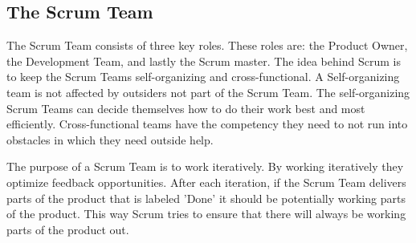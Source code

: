 \subsection{The Scrum Team}


The Scrum Team consists of three key roles. These roles are: the Product Owner, the 
Development Team, and lastly the Scrum master\cite{scrumguide11}. The idea behind Scrum is 
to keep the Scrum Teams self-organizing and cross-functional. A Self-organizing team is not 
affected by outsiders not part of the Scrum Team\cite{scrumguide11}. The self-organizing 
Scrum Teams can decide themselves how to do their work best and most 
efficiently\cite{scrumguide11}. Cross-functional teams have the competency they need to not 
run into obstacles in which they need outside help\cite{scrumguide11}.


The purpose of a Scrum Team is to work iteratively\cite{scrumguide11}. By working
iteratively they optimize feedback opportunities\cite{scrumguide11}. After each iteration,
if the Scrum Team delivers parts of the product that is labeled 'Done' it should be
potentially working parts of the product\cite{scrumguide11}. This way Scrum tries to ensure
that there will always be working parts of the product out\cite{scrumguide11}.



